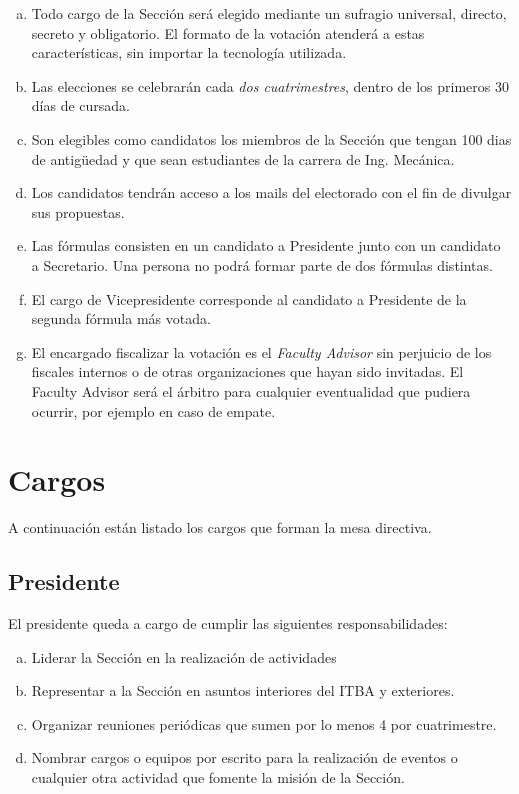 \documentclass[12pt]{article}
\begin{document}
\begin{enumerate}[a)]
\item Todo cargo de la Sección será elegido mediante un sufragio universal, directo, secreto y obligatorio. El formato de la votación atenderá a estas características, sin importar la tecnología utilizada.
\item Las elecciones se celebrarán cada \emph{dos cuatrimestres}, dentro de los primeros 30 días de cursada.  
\item Son elegibles como candidatos los miembros de la Sección que tengan 100 dias de antigüedad y que sean estudiantes de la carrera de Ing. Mecánica.
\item Los candidatos tendrán acceso a los mails del electorado con el fin de divulgar sus propuestas.
\item Las fórmulas consisten en un candidato a Presidente junto con un candidato a Secretario. Una persona no podrá formar parte de dos fórmulas distintas.
\item El cargo de Vicepresidente corresponde al candidato a Presidente de la segunda fórmula más votada. 
\item El encargado fiscalizar la votación es el \emph{Faculty Advisor} sin perjuicio de los fiscales internos o de otras organizaciones que hayan sido invitadas. El Faculty Advisor será el árbitro para cualquier eventualidad que pudiera ocurrir, por ejemplo en caso de empate.  
\end{enumerate}

\section{Cargos}
A continuación están listado los cargos que forman la mesa directiva.
\subsection{Presidente}
El presidente queda a cargo de cumplir las siguientes responsabilidades:
\begin{enumerate}[a)]
\item Liderar la Sección en la realización de actividades 
\item Representar a la Sección en asuntos interiores del ITBA y exteriores.
\item Organizar reuniones periódicas que sumen por lo menos 4 por cuatrimestre.
\item Nombrar cargos o equipos por escrito para la realización de eventos o cualquier otra actividad que fomente la misión de la Sección.
\end{enumerate}
\end{document}

